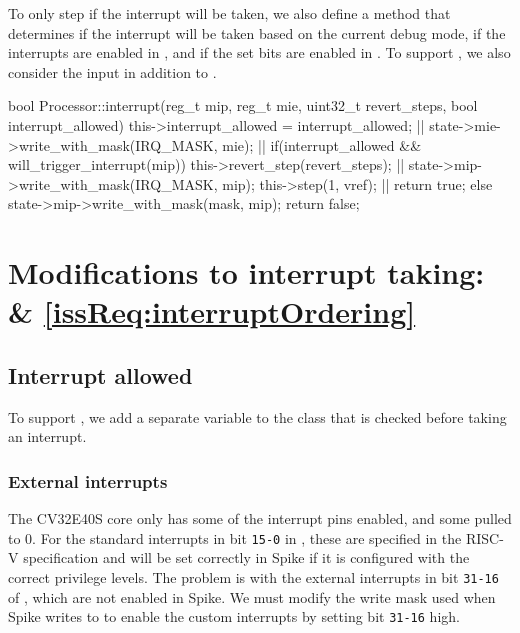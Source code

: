 \begin{sloppypar}
To only step if the interrupt will be taken, we also define a  method that determines if the interrupt will be taken based on the current debug mode, if the interrupts are enabled in , and if the set  bits are enabled in . To support , we also consider the  input in addition to  .
\end{sloppypar}

\begin{clisting}[label=lst:interrupt, caption=The function used to apply interrupt in spike.,escapechar=|]
bool Processor::interrupt(reg_t mip, reg_t mie, uint32_t revert_steps, bool interrupt_allowed) {
  this->interrupt_allowed = interrupt_allowed; |\label{line:interrupt_allowed}|
  state->mie->write_with_mask(IRQ_MASK, mie); |\label{line:mie}|
  if(interrupt_allowed && will_trigger_interrupt(mip)) {
    this->revert_step(revert_steps); |\label{line:revert}|
    state->mip->write_with_mask(IRQ_MASK, mip);
    this->step(1, vref); |\label{line:step}|
    return true;
  } else {
    state->mip->write_with_mask(mask, mip);
    return false;
  }
} 
\end{clisting}

\section{Modifications to interrupt taking:  \& \ref{issReq:interruptOrdering}}
\label{sec:iss_interruptModifications}

\subsection{Interrupt allowed}

To support , we add a separate  variable to the  class that is checked before taking an interrupt. 

\subsubsection{External interrupts}

The CV32E40S core only has some of the interrupt pins enabled, and some pulled to 0\cite{openhwgroupExceptionsInterruptsCOREV2023}. For the standard interrupts in bit \texttt{15-0} in , these are specified in the RISC-V specification \cite{watermanRISCVInstructionSet2021} and will be set correctly in Spike if it is configured with the correct privilege levels.
The problem is with the external interrupts in bit \texttt{31-16} of , which are not enabled in Spike. We must modify the write mask used when Spike writes to  to enable the custom interrupts by setting bit \texttt{31-16} high.

